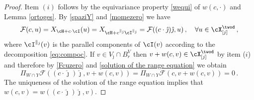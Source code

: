 \documentclass[11pt,a4paper,reqno]{article}
\numberwithin{equation}{section}
\theoremstyle{definition}
\begin{document}
\begin{proof}
Item  $(i) $ follows 
  by the equivariance property
  \eqref{wequi} of  $ w ( c, \cdot ) $ and   Lemma \ref{ortoges}.  By \eqref{spaziY} and 
  \eqref{momezero} we have
\begin{equation}\label{Fcuzero}
\mathcal{F}(c, u)  =
X_{\cH + c\cdot \cI}(u)  =
X_{\cH+c^{\parallel_{\hat \jmath}}\cI^{\parallel_{\hat \jmath}}}  = 
\mathcal{F}( (c\cdot \hat\jmath)\hat\jmath , u) \, 
, \quad \forall u \in \cX_{[j]}^{\twod} \, ,  
\end{equation}
where $\cI^{\parallel_{\hat \jmath}}(v)$ is the parallel components of $\cI(v)$ according to the decomposition \eqref{eq:compoc}.
  If $v\in V_{\hat \jmath}\cap B_r^V$ 
  then $v+w(c,v) \in \cX_{[j]}^{\twod} $ by item ($i$)
  and  therefore by \eqref{Fcuzero} and \eqref{solution of the range equation} we obtain
    $$
        \Pi_{W\cap Y} 
        \mathcal{F}( (c\cdot \hat\jmath)\hat\jmath , v+w(c,v)) = \Pi_{W\cap Y} 
        \mathcal{F}(c, v+w(c,v) ) = 0 \, . 
    $$
The uniqueness of the solution of the range equation implies that 
$w(c,v)=w((c\cdot \hat\jmath)\hat\jmath ,v)$.
\end{proof}
\end{document}
